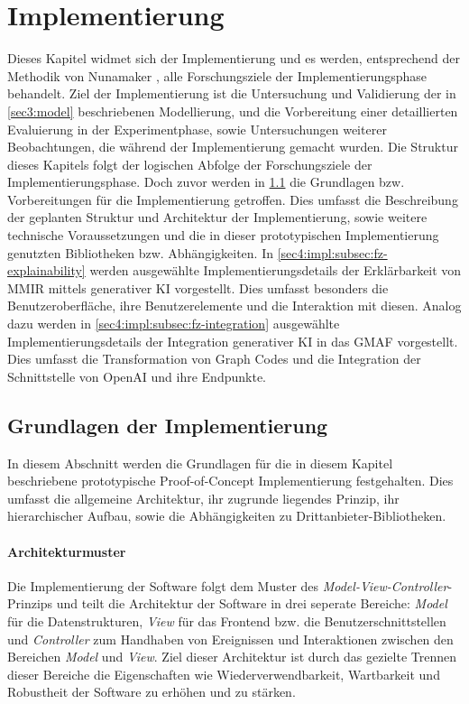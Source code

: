 \section{Implementierung}
\label{sec4:impl}
Dieses Kapitel widmet sich der Implementierung und es werden, entsprechend der Methodik von Nunamaker \cite{nunamaker}, alle Forschungsziele der Implementierungsphase behandelt.
Ziel der Implementierung ist die Untersuchung und Validierung der in \cref{sec3:model} beschriebenen Modellierung, und die Vorbereitung einer detaillierten Evaluierung in der Experimentphase, sowie Untersuchungen weiterer Beobachtungen, die während der Implementierung gemacht wurden.
Die Struktur dieses Kapitels folgt der logischen Abfolge der Forschungsziele der Implementierungsphase.
Doch zuvor werden in \cref{sec4:impl:subsec:basics} die Grundlagen bzw. Vorbereitungen für die Implementierung getroffen.
Dies umfasst die Beschreibung der geplanten Struktur und Architektur der Implementierung, sowie weitere technische Voraussetzungen und die in dieser prototypischen Implementierung genutzten Bibliotheken bzw. Abhängigkeiten.
In \cref{sec4:impl:subsec:fz-explainability} werden ausgewählte Implementierungsdetails der Erklärbarkeit von MMIR mittels generativer KI vorgestellt.
Dies umfasst besonders die Benutzeroberfläche, ihre Benutzerelemente und die Interaktion mit diesen.
Analog dazu werden in \cref{sec4:impl:subsec:fz-integration} ausgewählte Implementierungsdetails der Integration generativer KI in das GMAF vorgestellt.
Dies umfasst die Transformation von Graph Codes und die Integration der Schnittstelle von OpenAI und ihre Endpunkte.



\subsection{Grundlagen der Implementierung}
\label{sec4:impl:subsec:basics}
In diesem Abschnitt werden die Grundlagen für die in diesem Kapitel beschriebene prototypische Proof-of-Concept Implementierung festgehalten.
Dies umfasst die allgemeine Architektur, ihr zugrunde liegendes Prinzip, ihr hierarchischer Aufbau, sowie die Abhängigkeiten zu Drittanbieter-Bibliotheken.

\paragraph{Architekturmuster}
Die Implementierung der Software folgt dem Muster des \textit{Model-View-Controller}-Prinzips und teilt die Architektur der Software in drei seperate Bereiche: \textit{Model} für die Datenstrukturen, \textit{View} für das Frontend bzw. die Benutzerschnittstellen und \textit{Controller} zum Handhaben von Ereignissen und Interaktionen zwischen den Bereichen \textit{Model} und \textit{View}.
Ziel dieser Architektur ist durch das gezielte Trennen dieser Bereiche die Eigenschaften wie Wiederverwendbarkeit, Wartbarkeit und Robustheit der Software zu erhöhen und zu stärken.

